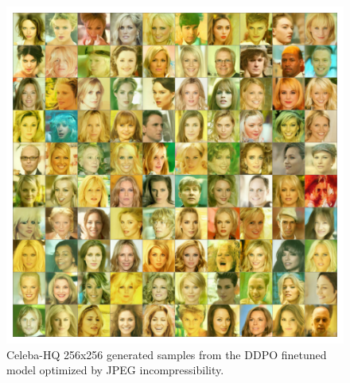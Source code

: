 \begin{appendixs}
        \begin{figure}
            \centering
            \includegraphics[scale=0.75]{img/results/ddpo-incompressibility-samples.png}
            \vspace{-4pt}  %
            \captionsetup{width=\textwidth} %
            \caption{Celeba-HQ 256x256 generated samples from the DDPO finetuned model optimized by JPEG incompressibility.}
            \label{fig:ddpo-incompressibility-samples}
        \end{figure}


\end{appendixs}
